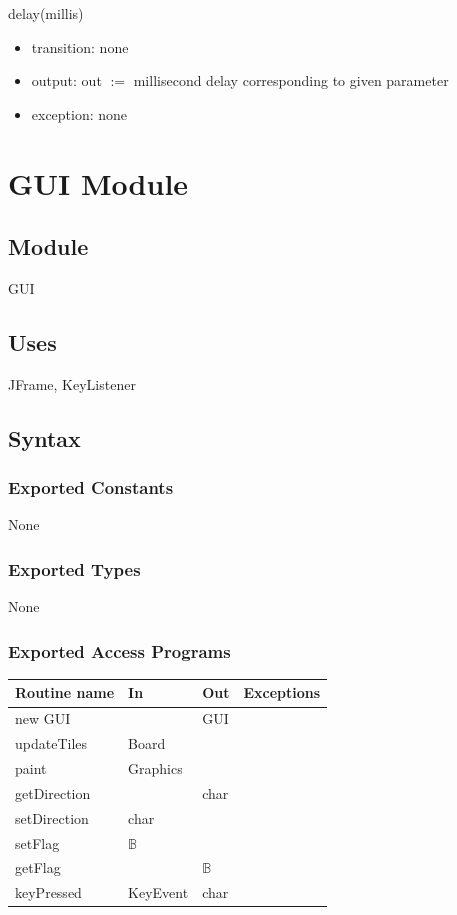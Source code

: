 \documentclass[12pt]{article}
\begin{document}
\noindent delay(millis)
\begin{itemize}
    \item transition: none
    \item output: out $:=$ millisecond delay corresponding to given parameter
    \item exception: none
\end{itemize}

\newpage


\section* {GUI Module}

\subsection*{Module}

GUI

\subsection* {Uses}

JFrame, KeyListener

\subsection* {Syntax}

\subsubsection* {Exported Constants}

None

\subsubsection* {Exported Types}

None

\subsubsection* {Exported Access Programs}

\begin{tabular}{| l | l | l | p{5cm} |}
\hline
\textbf{Routine name} & \textbf{In} & \textbf{Out} & \textbf{Exceptions}\\
\hline
new GUI & & GUI & ~\\
\hline
updateTiles & Board & & ~\\
\hline
paint & Graphics & & ~\\
\hline
getDirection & & char &~\\
\hline
setDirection & char & &~\\
\hline
setFlag & $\mathbb{B}$ & & ~\\
\hline
getFlag & & $\mathbb{B}$ & ~\\
\hline
keyPressed & KeyEvent & char &~\\
\hline
\end{tabular}
\end{document}
